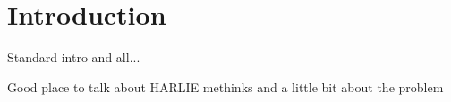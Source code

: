 \section{Introduction}

Standard intro and all...

Good place to talk about HARLIE methinks and a little bit about the problem
